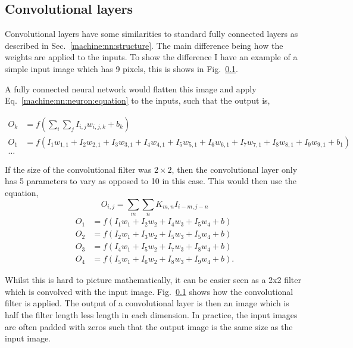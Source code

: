 \subsection{Convolutional layers}

Convolutional layers have some similarities to standard fully connected layers as described in Sec.~\ref{machine:nn:structure}. 
The main difference being how the weights are applied to the inputs.
To show the difference I have an example of a simple input image which has 9 pixels, this is shows in Fig.~\ref{}.

A fully connected neural network would flatten this image and apply Eq.~\ref{machine:nn:neuron:equation} to the inputs, such that the output is,

\begin{equation}
\begin{split}
    O_{k} &= f\left(\sum_{i} \sum_{j} I_{i,j} w_{i,j,k} + b_k \right) \\
    O_1 &= f\left(I_1 w_{1,1} + I_2 w_{2,1} + I_3 w_{3,1} + I_4 w_{4,1} + I_5 w_{5,1} + I_6 w_{6,1} + I_7 w_{7,1} + I_8 w_{8,1} + I_9 w_{9,1} + b_1\right) \\
     \dots
\end{split}
\end{equation}

If the size of the convolutional filter was $2\times 2$, then the convolutional layer only has 5 parameters to vary as opposed to 10 in this case.
This would then use the equation,
\begin{equation}
    O_{i,j} = \sum_{m} \sum_{n} K_{m,n}I_{i-m,j-n}
\end{equation}
\begin{equation}
\begin{split}
    O_1 &= f\left(I_1 w_1 + I_2 w_2 + I_4 w_3 + I_5 w_4 + b\right) \\
    O_2 &=  f\left( I_2 w_1 + I_3 w_2 + I_5 w_3 + I_5 w_4 + b\right)\\
    O_3 &=  f\left(I_4 w_1 + I_5 w_2 + I_7 w_3 + I_8 w_4 + b\right)\\
    O_4 &=  f\left(I_5 w_1 + I_6 w_2 + I_8 w_3 + I_9 w_4 + b\right).
\end{split}
\end{equation}

Whilst this is hard to picture mathematically, it can be easier seen as a 2x2 filter which is convolved with the input image. 
Fig.~\ref{} shows how the convolutional filter is applied.
The output of a convolutional layer is then an image which is half the filter length less length in each dimension. 
In practice, the input images are often padded with zeros such that the output image is the same size as the input image. 

